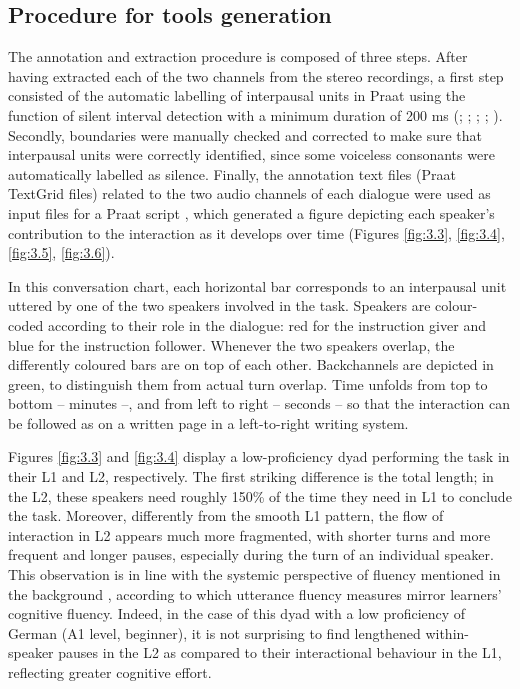 \subsection{Procedure for tools generation}
\label{sec:3.2.4}
The annotation and extraction procedure is composed of three steps. After having extracted each of the two channels from the stereo recordings, a first step consisted of the automatic labelling of interpausal units in Praat using the function of silent interval detection with a minimum duration of 200 ms (\citealt{GleitmanEtAl2007}; \citealt{GriffinBock2000}; \citealt{LevinsonTorreira2015}; \citealt{SchnurEtAl2006}; \citealt{WesselingVanSon2005}). Secondly, boundaries were manually checked and corrected to make sure that interpausal units were correctly identified, since some voiceless consonants were automatically labelled as silence. Finally, the annotation text files (Praat TextGrid files) related to the two audio channels of each dialogue were used as input files for a Praat script \citep{CangemiEtAl2023}, which generated a figure depicting each speaker’s contribution to the interaction as it develops over time (Figures \ref{fig:3.3}, \ref{fig:3.4}, \ref{fig:3.5}, \ref{fig:3.6}).

In this conversation chart, each horizontal bar corresponds to an interpausal unit uttered by one of the two speakers involved in the task. Speakers are colour-coded according to their role in the dialogue: red for the instruction giver and blue for the instruction follower. Whenever the two speakers overlap, the differently coloured bars are on top of each other. Backchannels are depicted in green, to distinguish them from actual turn overlap. Time unfolds from top to bottom – minutes –, and from left to right – seconds – so that the interaction can be followed as on a written page in a left-to-right writing system.

Figures \ref{fig:3.3} and \ref{fig:3.4} display a low-proficiency dyad performing the task in their L1 and L2, respectively. The first striking difference is the total length; in the L2, these speakers need roughly 150\% of the time they need in L1 to conclude the task. Moreover, differently from the smooth L1 pattern, the flow of interaction in L2 appears much more fragmented, with shorter turns and more frequent and longer pauses, especially during the turn of an individual speaker. This observation is in line with the systemic perspective of fluency mentioned in the background \citep{Kormos2006}, according to which utterance fluency measures mirror learners’ cognitive fluency. Indeed, in the case of this dyad with a low proficiency of German (A1 level, beginner), it is not surprising to find lengthened within-speaker pauses in the L2 as compared to their interactional behaviour in the L1, reflecting greater cognitive effort.


